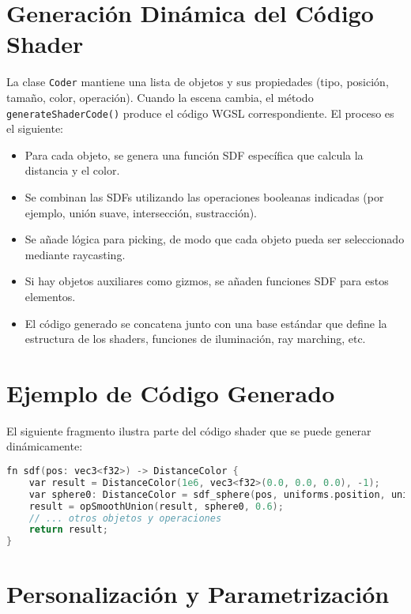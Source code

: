 \section{Generación Dinámica del Código Shader}

La clase \texttt{Coder} mantiene una lista de objetos y sus propiedades (tipo,
posición, tamaño, color, operación). Cuando la escena cambia, el método
\texttt{generateShaderCode()} produce el código WGSL correspondiente. El
proceso es el siguiente:

\begin{itemize}
    \item Para cada objeto, se genera una función SDF específica que calcula la distancia
          y el color.
    \item Se combinan las SDFs utilizando las operaciones booleanas indicadas (por
          ejemplo, unión suave, intersección, sustracción).
    \item Se añade lógica para picking, de modo que cada objeto pueda ser seleccionado
          mediante raycasting.
    \item Si hay objetos auxiliares como gizmos, se añaden funciones SDF para estos
          elementos.
    \item El código generado se concatena junto con una base estándar que define la
          estructura de los shaders, funciones de iluminación, ray marching, etc.
\end{itemize}

\section{Ejemplo de Código Generado}

El siguiente fragmento ilustra parte del código shader que se puede generar
dinámicamente:

\begin{lstlisting}[language=C++, caption={Fragmento de código WGSL generado}]
fn sdf(pos: vec3<f32>) -> DistanceColor {
    var result = DistanceColor(1e6, vec3<f32>(0.0, 0.0, 0.0), -1);
    var sphere0: DistanceColor = sdf_sphere(pos, uniforms.position, uniforms.size[0], uniforms.color, 0);
    result = opSmoothUnion(result, sphere0, 0.6);
    // ... otros objetos y operaciones
    return result;
}
\end{lstlisting}

\section{Personalización y Parametrización}


